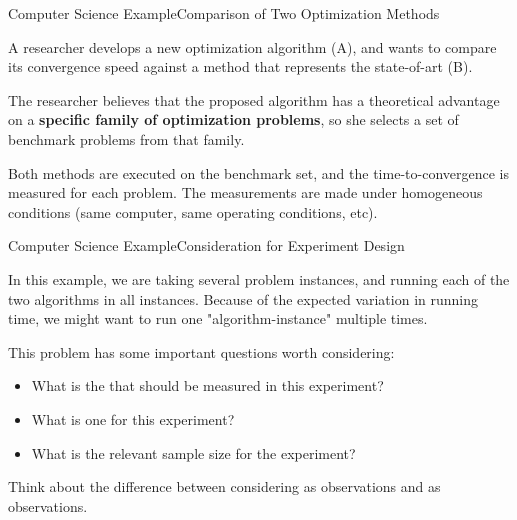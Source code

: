 \begin{frame}{Computer Science Example}{Comparison of Two Optimization Methods}

A researcher develops a new optimization algorithm (A), and wants to compare its
convergence speed against a method that represents the state-of-art (B).\bigskip

The researcher believes that the proposed algorithm has a theoretical advantage on a {\bf specific family of optimization problems}, so she selects a set of benchmark problems from that family.\bigskip

Both methods are executed on the benchmark set, and the time-to-convergence is measured for each problem. The measurements are made under homogeneous conditions (same computer, same operating conditions, etc).
\end{frame}

\begin{frame}{Computer Science Example}{Consideration for Experiment Design}

In this example, we are taking several problem instances, and running each
of the two algorithms in all instances. Because of the expected variation in
running time, we might want to run one "algorithm-instance" multiple times.\bigskip

This problem has some important questions worth considering:
\bigskip

\begin{itemize}
  \item What is the  that should be measured in this experiment?
  \item What is one  for this experiment?
  \item What is the relevant sample size for the experiment?
\end{itemize}
\bigskip

\begin{block}{}
  Think about the difference between considering  as observations and  as observations.
\end{block}
\end{frame}


